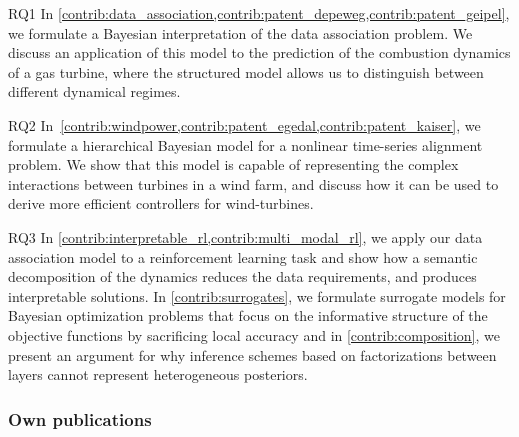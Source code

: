 \begin{compactdesc}
    \item[RQ1]
    In \cref{contrib:data_association,contrib:patent_depeweg,contrib:patent_geipel}, we formulate a Bayesian interpretation of the data association problem.
    We discuss an application of this model to the prediction of the combustion dynamics of a gas turbine, where the structured model allows us to distinguish between different dynamical regimes.
    \item[RQ2]
    In~\cref{contrib:windpower,contrib:patent_egedal,contrib:patent_kaiser}, we formulate a hierarchical Bayesian model for a nonlinear time-series alignment problem.
    We show that this model is capable of representing the complex interactions between turbines in a wind farm, and discuss how it can be used to derive more efficient controllers for wind-turbines.
    \item[RQ3]
    In \cref{contrib:interpretable_rl,contrib:multi_modal_rl}, we apply our data association model to a reinforcement learning task and show how a semantic decomposition of the dynamics reduces the data requirements, and produces interpretable solutions.
    In \cref{contrib:surrogates}, we formulate surrogate models for Bayesian optimization problems that focus on the informative structure of the objective functions by sacrificing local accuracy and in \cref{contrib:composition}, we present an argument for why inference schemes based on factorizations between layers cannot represent heterogeneous posteriors.
\end{compactdesc}


\subsubsection{Own publications}

